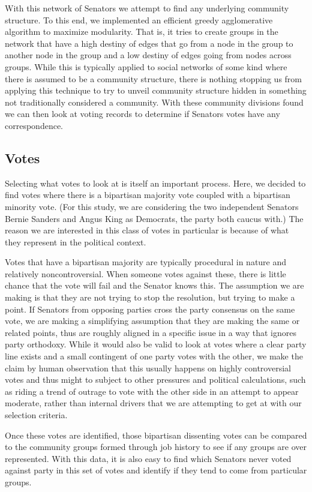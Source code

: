 \documentclass[11pt,twocolumn]{article}
\begin{document}
With this network of Senators we attempt to find any underlying community structure. To this end, we implemented an efficient greedy agglomerative algorithm to maximize modularity. That is, it tries to create groups in the network that have a high destiny of edges that go from a node in the group to another node in the group and a low destiny of edges going from nodes across groups. While this is typically applied to social networks of some kind where there is assumed to be a community structure, there is nothing stopping us from applying this technique to try to unveil community structure hidden in something not traditionally considered a community. With these community divisions found we can then look at voting records to determine if Senators votes have any correspondence.

	\subsection{Votes}
Selecting what votes to look at is itself an important process. Here, we decided to find votes where there is a bipartisan majority vote coupled with a bipartisan minority vote. (For this study, we are considering the two independent Senators Bernie Sanders and Angus King as Democrats, the party both caucus with.) The reason we are interested in this class of votes in particular is because of what they represent in the political context.

Votes that have a bipartisan majority are typically procedural in nature and relatively noncontroversial. When someone votes against these, there is little chance that the vote will fail and the Senator knows this. The assumption we are making is that they are not trying to stop the resolution, but trying to make a point. If Senators from opposing parties cross the party consensus on the same vote, we are making a simplifying assumption that they are making the same or related points, thus are roughly aligned in a specific issue in a way that ignores party orthodoxy. While it would also be valid to look at votes where a clear party line exists and a small contingent of one party votes with the other, we make the claim by human observation that this usually happens on highly controversial votes and thus might to subject to other pressures and political calculations, such as riding a trend of outrage to vote with the other side in an attempt to appear moderate, rather than internal drivers that we are attempting to get at with our selection criteria.

Once these votes are identified, those bipartisan dissenting votes can be compared to the community groups formed through job history to see if any groups are over represented. With this data, it is also easy to find which Senators never voted against party in this set of votes and identify if they tend to come from particular groups.
\end{document}
